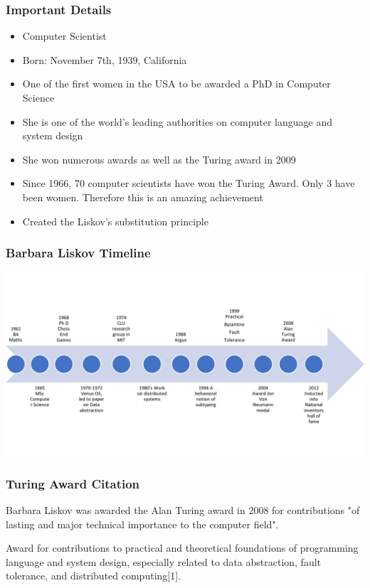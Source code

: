 \documentclass{beamer}
\begin{document}
\begin{frame}
\frametitle{Important Details}
\begin{itemize}
\item Computer Scientist
\item Born: November 7th, 1939, California
\item One of the first women in the USA to be awarded a PhD in Computer Science
\item She is one of the world's leading authorities on computer language and system design
\item She won numerous awards as well as the Turing award in 2009
\item Since 1966, 70 computer scientists have won the Turing Award. Only 3 have been women. Therefore this is an amazing achievement
\item Created the Liskov's substitution principle
\end{itemize}
\end{frame}

\begin{frame}
\frametitle{Barbara Liskov Timeline}

\includegraphics[scale=0.7]{timeline.jpg}

    
\end{frame}
\begin{frame}
\frametitle{Turing Award Citation}
Barbara Liskov was awarded the Alan Turing award in 2008 for  contributions "of lasting and major technical importance to the computer field". 

\vspace{5mm} %

Award for contributions to practical and theoretical foundations of programming language and system design, especially related to data abstraction, fault tolerance, and distributed computing[1]. 

\vspace{5mm}

\end{frame}
\end{document}
